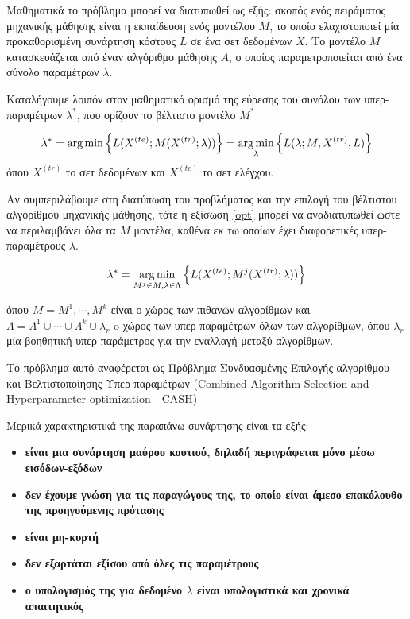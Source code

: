  	Μαθηματικά το πρόβλημα μπορεί να διατυπωθεί ως εξής: σκοπός ενός πειράματος μηχανικής μάθησης είναι η εκπαίδευση ενός μοντέλου $M$, το οποίο ελαχιστοποιεί μία προκαθορισμένη συνάρτηση κόστους $L$ σε ένα σετ δεδομένων $X$. Το μοντέλο $Μ$ κατασκευάζεται από έναν αλγόριθμο μάθησης $Α$, ο οποίος παραμετροποιείται από ένα σύνολο παραμέτρων $\lambda$.
 	
 	Καταλήγουμε λοιπόν στον μαθηματικό ορισμό της εύρεσης του συνόλου των υπερ-παραμέτρων $\lambda^*$, που ορίζουν το βέλτιστο μοντέλο $M^*$
 	
 	
 	\begin{equation}
 	\label{opt}
 	\lambda^* = \operatorname*{arg\,min} \left \{L(X^{(te)}; M(X^{(tr)}; \lambda)) \right \} = \operatorname*{arg\,min}_{\lambda} \left \{L(\lambda; M, X^{(tr)}, L) \right \}
 	\end{equation} 
 	όπου $X^{(tr)}$ το σετ δεδομένων και $X^{(te)}$ το σετ ελέγχου.
 	
 	Αν συμπεριλάβουμε στη διατύπωση του προβλήματος και την επιλογή του βέλτιστου αλγορίθμου μηχανικής μάθησης, τότε η εξίσωση \ref{opt} μπορεί να αναδιατυπωθεί ώστε να περιλαμβάνει όλα τα $M$ μοντέλα, καθένα εκ τω οποίων έχει διαφορετικές υπερ-παραμέτρους $\lambda$. 
 	
 	\begin{equation}
 	\label{optCash}
 	\lambda^* = \operatorname*{arg\,min}_{M^{j} \in M, \lambda \in \Lambda} \left \{L(X^{(te)}; M^{j}(X^{(tr)}; \lambda)) \right \}
 	\end{equation} 
 	
 	όπου $M ={M^{1}, \cdots, M^{k}}$ είναι ο χώρος των πιθανών αλγορίθμων και $ \Lambda = \Lambda^{1} \cup \cdots \cup \Lambda^{k} \cup {\lambda_r} $ o χώρος των υπερ-παραμέτρων όλων των αλγορίθμων, όπου $\lambda_r$ μία βοηθητική υπερ-παράμετρος για την εναλλαγή μεταξύ αλγορίθμων.
 	
 	Το πρόβλημα αυτό αναφέρεται ως Πρόβλημα Συνδυασμένης Επιλογής αλγορίθμου και Βελτιστοποίησης Υπερ-παραμέτρων (Combined Algorithm Selection and Hyperparameter optimization - CASH) \citep{DBLP:journals/corr/LoshchilovH16}
 	
	Μερικά χαρακτηριστικά της παραπάνω συνάρτησης είναι τα εξής:
	\begin{itemize}
		\item \textbf{είναι μια συνάρτηση μαύρου κουτιού, δηλαδή περιγράφεται μόνο μέσω εισόδων-εξόδων}
		\item \textbf{δεν έχουμε γνώση για τις παραγώγους της, το οποίο είναι άμεσο επακόλουθο της προηγούμενης πρότασης}
		\item \textbf{είναι μη-κυρτή} 
		\item \textbf{δεν εξαρτάται εξίσου από όλες τις παραμέτρους} 
		\item \textbf{ο υπολογισμός της για δεδομένο $\lambda$ είναι υπολογιστικά και χρονικά απαιτητικός}
	\end{itemize}
	
